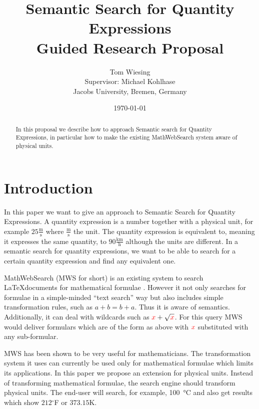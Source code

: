 \documentclass[11pt]{article}
\title{Semantic Search for Quantity Expressions\ednote{Alternative Title: Units for MathWebSearch}\\ \vspace{2 mm} Guided Research Proposal}
\author{Tom Wiesing\\Supervisor: Michael Kohlhase\\Jacobs University, Bremen, Germany}
\date{\today}
\begin{document}
\maketitle

\begin{abstract}
  In this proposal we describe how to approach Semantic search for Quantity Expressions, in particular how to make the existing MathWebSearch system aware of physical units.
\end{abstract}

\section{Introduction}

In this paper we want to give an approach to Semantic Search for Quantity Expressions. A quantity expression is a number together with a physical unit, for example $25 \frac{\text{m}}{\text{s}}$ where $\frac{\text{m}}{\text{s}}$ the unit. The quantity expression is equivalent to, meaning it expresses the same quantity, to $90 \frac{\text{km}}{\text{h}}$ although the units are different. In a semantic search for quantity expressions, we want to be able to search for a certain quantity expression and find any equivalent one.

MathWebSearch (MWS for short) is an existing system to search \LaTeX documents for mathematical formulae . However it not only searches for formulae in a simple-minded ``text search'' way but also includes simple transformation rules, such as $a + b = b + a$. Thus it is aware of semantics. Additionally, it can deal with wildcards such as $ { \color{red} x} + \sqrt{\color{red} x}$. For this query MWS would deliver formulars which are of the form as above with $ { \color{red} x} $ substituted with any sub-formular.

MWS has been shown to be very useful for mathematicians. The transformation system it uses can currently be used only for mathematical formulae which limits its applications. In this paper we propose an extension for physical units. Instead of transforming mathematical formulae, the search engine should transform physical units.
The end-user will search, for example, \SI{100}{\degreeCelsius} and also get results which show $212$$^\circ$F or $373.15$K.
\end{document}
